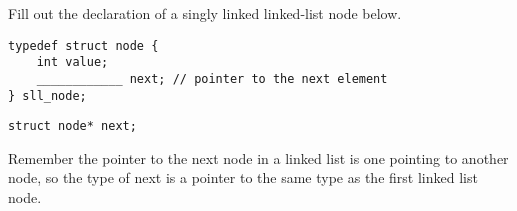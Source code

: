 \begin{blocksection}
\question
Fill out the declaration of a singly linked linked-list node below.

\begin{verbatim}
typedef struct node {
    int value;
    ____________ next; // pointer to the next element 
} sll_node;
\end{verbatim}

\begin{solution}
\lstinline$struct node* next;$

Remember the pointer to the next node in a linked list is one pointing to another node, so the type of next is a pointer to the same type as the first linked list node.
\end{solution}
\end{blocksection}